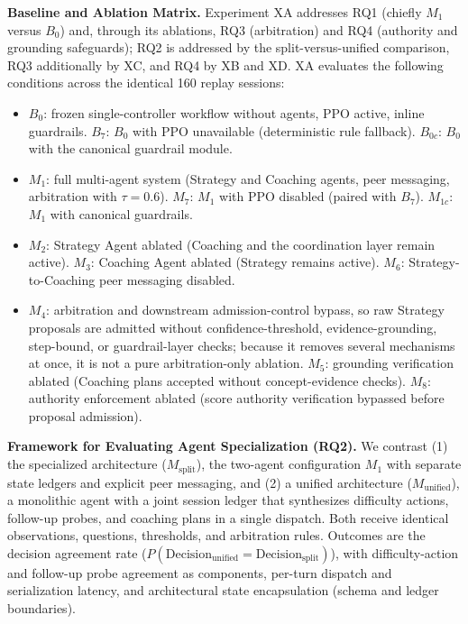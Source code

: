 \documentclass[runningheads,a4paper]{llncs}
\newcommand{\Msplit}{M_{\mathrm{split}}}
\newcommand{\Munified}{M_{\mathrm{unified}}}
\begin{document}
\textbf{Baseline and Ablation Matrix.} Experiment XA addresses RQ1 (chiefly $M_1$ versus $B_0$) and, through its ablations, RQ3 (arbitration) and RQ4 (authority and grounding safeguards); RQ2 is addressed by the split-versus-unified comparison, RQ3 additionally by XC, and RQ4 by XB and XD. XA evaluates the following conditions across the identical 160 replay sessions:
\begin{itemize}\setlength{\itemsep}{0pt}\setlength{\topsep}{2pt}
\item $B_0$: frozen single-controller workflow without agents, PPO active, inline guardrails. $B_7$: $B_0$ with PPO unavailable (deterministic rule fallback). $B_{0c}$: $B_0$ with the canonical guardrail module.
\item $M_1$: full multi-agent system (Strategy and Coaching agents, peer messaging, arbitration with $\tau=0.6$). $M_7$: $M_1$ with PPO disabled (paired with $B_7$). $M_{1c}$: $M_1$ with canonical guardrails.
\item $M_2$: Strategy Agent ablated (Coaching and the coordination layer remain active). $M_3$: Coaching Agent ablated (Strategy remains active). $M_6$: Strategy-to-Coaching peer messaging disabled.
\item $M_4$: arbitration and downstream admission-control bypass, so raw Strategy proposals are admitted without confidence-threshold, evidence-grounding, step-bound, or guardrail-layer checks; because it removes several mechanisms at once, it is not a pure arbitration-only ablation. $M_5$: grounding verification ablated (Coaching plans accepted without concept-evidence checks). $M_8$: authority enforcement ablated (score authority verification bypassed before proposal admission).
\end{itemize}

\textbf{Framework for Evaluating Agent Specialization (RQ2).} We contrast (1) the specialized architecture ($\Msplit$), the two-agent configuration $M_1$ with separate state ledgers and explicit peer messaging, and (2) a unified architecture ($\Munified$), a monolithic agent with a joint session ledger that synthesizes difficulty actions, follow-up probes, and coaching plans in a single dispatch. Both receive identical observations, questions, thresholds, and arbitration rules. Outcomes are the decision agreement rate ($P(\mathrm{Decision}_{\mathrm{unified}}=\mathrm{Decision}_{\mathrm{split}})$), with difficulty-action and follow-up probe agreement as components, per-turn dispatch and serialization latency, and architectural state encapsulation (schema and ledger boundaries).
\end{document}
